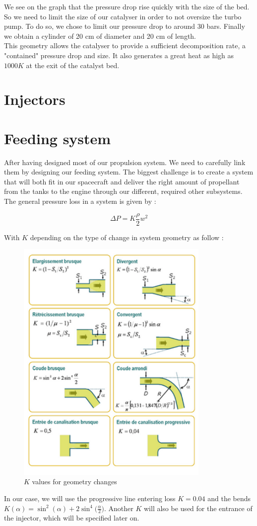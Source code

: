 We see on the graph that the pressure drop rise quickly with the size of the bed. So we need to limit the size of our catalyser in order to not oversize the turbo pump. To do so, we chose to limit our pressure drop to around 30 bars. Finally we obtain a cylinder of 20 cm of diameter and 20 cm of length. \\

This geometry allows the catalyser to provide a sufficient decomposition rate, a "contained" pressure drop and size. It also generates a great heat as high as $1000K$ at the exit of the catalyst bed. 

\section{Injectors}
\section{Feeding system}
After having designed most of our propulsion system. We need to carefully link them by designing our feeding system. The biggest challenge is to create a system that will both fit in our spacecraft and deliver the right amount of propellant from the tanks to the engine through our different, required other subsystems.\\

The general pressure loss in a system is given by :

$$
\Delta P = K\frac \rho 2 w^2
$$

With $K$ depending on the type of change in system geometry as follow : 
\begin{figure}[H]
	\centering
	\includegraphics[height=12cm]{pertecharge}
	\caption{$K$ values for geometry changes}
\end{figure}
In our case, we will use the progressive line entering loss $K = 0.04$ and the bends $ K(\alpha) = \sin^2(\alpha) + 2\sin^4\bigg(\frac\alpha 2\bigg)$. Another $K$ will also be used for the entrance of the injector, which will be specified later on.\\

